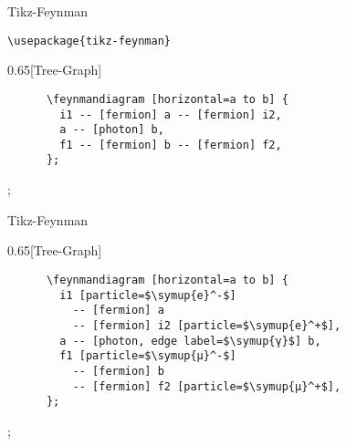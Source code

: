 \begin{frame}[fragile]{Tikz-Feynman}
  \begin{Packages}
    \lstinline+\usepackage{tikz-feynman}+
  \end{Packages}
  \begin{CodeExample}{0.65}[Tree-Graph]
    \begin{lstlisting}
      \feynmandiagram [horizontal=a to b] {
        i1 -- [fermion] a -- [fermion] i2,
        a -- [photon] b,
        f1 -- [fermion] b -- [fermion] f2,
      };
    \end{lstlisting}
  \CodeResult
    ;
  \end{CodeExample}
\end{frame}

\begin{frame}[fragile]{Tikz-Feynman}
  \begin{CodeExample}{0.65}[Tree-Graph]
    \begin{lstlisting}
      \feynmandiagram [horizontal=a to b] {
        i1 [particle=$\symup{e}^-$]
          -- [fermion] a
          -- [fermion] i2 [particle=$\symup{e}^+$],
        a -- [photon, edge label=$\symup{γ}$] b,
        f1 [particle=$\symup{μ}^-$]
          -- [fermion] b
          -- [fermion] f2 [particle=$\symup{μ}^+$],
      };
    \end{lstlisting}
  \CodeResult
    ;
  \end{CodeExample}
\end{frame}
